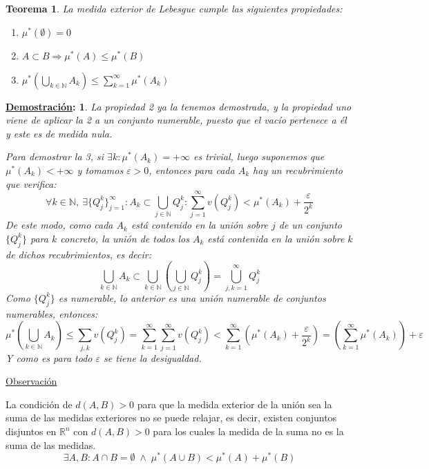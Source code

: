 \documentclass[10pt,a4paper,openright]{book}
\theoremstyle{break}
\newtheorem*{theo}{Teorema}
\newtheorem*{demo}{\underline{Demostración}:}
\begin{document}
\begin{theo}
    La medida exterior de Lebesgue cumple las siguientes propiedades: 
    \begin{enumerate}
        \item $ \mu^*\left( \emptyset \right) = 0 $ 
        \item $A \subset B \Rightarrow \mu^*\left( A \right) \le \mu^*\left( B \right)$
        \item $ \mu^*\left( \bigcup_{k\in \mathbb{N}} A_k \right) \le \sum_{k=1}^{\infty} \mu^*\left( A_k \right)$
    \end{enumerate}
\end{theo}
 \begin{demo}
La propiedad 2 ya la tenemos demostrada, y la propiedad uno viene de aplicar la 2 a un conjunto numerable, puesto que el vacío pertenece a él y este es de medida nula. 

Para demostrar la 3, si $\exists k: \mu^*\left( A_k \right) = +\infty$ es trivial, luego suponemos que $ \mu^*\left( A_k \right) < +\infty$ y tomamos $ \varepsilon>0$, entonces para cada $A_k$ hay un recubrimiento que verifica:
$$ \forall k \in \mathbb N, \ \exists \{Q_j^k\}_{j=1}^\infty : A_k \subset \bigcup_{j \in \mathbb{N}} Q_j^{k} : \sum_{j=1}^{\infty} v\left( Q_j^k \right) < \mu^*\left( A_k \right) + \frac{\varepsilon}{2^k}
$$
De este modo, como cada $A_k$ está contenido en la unión sobre $j$ de un conjunto $\{Q_j^k\}$ para $k$ concreto, la unión de todos los $A_k$ está contenida en la unión sobre $k$ de dichos recubrimientos, es decir: 
$$\bigcup_{k \in \mathbb{N}} A_k \subset \bigcup_{k \in \mathbb{N}} \left(\bigcup_{j \in \mathbb{N}} Q_j^k  \right) = \bigcup_{j, k = 1} ^{\infty} Q_j^k$$
Como $\{Q_j^k\}$ es numerable, lo anterior es una unión numerable de conjuntos numerables,  entonces:
$$\mu^*\left( \bigcup_{k\in \mathbb{N}} A_k \right) \le \sum_{j, k} v\left( Q_j^k \right) = \sum_{k=1}^{\infty} \sum_{j=1}^{\infty} v\left( Q_j^k \right) < \sum_{k=1}^{\infty} \left( \mu^*\left( A_k \right) + \frac{\varepsilon}{2^k} \right) = \left( \sum_{k=1}^{\infty} \mu^*\left( A_k \right) \right) + \varepsilon $$
Y como es para todo $\varepsilon$ se tiene la desigualdad.
\end{demo}

\underline{Observación}

La condición de $d(A,B) > 0$ para que la medida exterior de la unión sea la suma de las medidas exteriores no se puede relajar, es decir, existen conjuntos disjuntos en $\mathbb{R}^n $ con $d(A,B)>0$ para los cuales la medida de la suma no es la suma de las medidas.
$$\exists A, B: A\cap B = \emptyset\; \land \;\mu^*\left( A\cup B \right) < \mu^*\left( A \right) + \mu^*\left( B \right)$$
\end{document}
